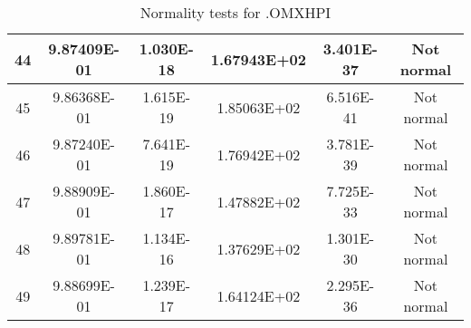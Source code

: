 \begin{table}[h]
\begin{tabular}{|c|c|c|c|c|c|}
		44 & 9.87409E-01 & 1.030E-18 & 1.67943E+02 & 3.401E-37 & Not normal\\\hline
		45 & 9.86368E-01 & 1.615E-19 & 1.85063E+02 & 6.516E-41 & Not normal\\\hline
		46 & 9.87240E-01 & 7.641E-19 & 1.76942E+02 & 3.781E-39 & Not normal\\\hline
		47 & 9.88909E-01 & 1.860E-17 & 1.47882E+02 & 7.725E-33 & Not normal\\\hline
		48 & 9.89781E-01 & 1.134E-16 & 1.37629E+02 & 1.301E-30 & Not normal\\\hline
		49 & 9.88699E-01 & 1.239E-17 & 1.64124E+02 & 2.295E-36 & Not normal\\\hline
	\end{tabular}
	\caption{Normality tests for .OMXHPI}
\end{table}
